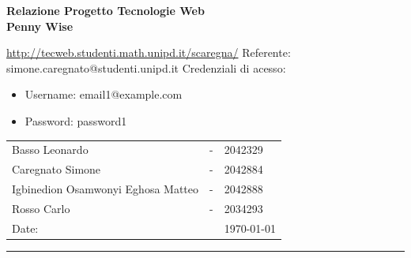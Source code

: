 \begin{titlepage}
\noindent{}
\vspace{15pt}
\textcolor{UM_Brown}{
\begin{flushleft}
    \textbf{\huge{Relazione Progetto Tecnologie Web}}\\
    \vspace{15pt}
    \huge \textbf{Penny Wise} \\
    \vspace{15pt}
	\begin{large}
    \url{http://tecweb.studenti.math.unipd.it/scaregna/}
	\newline
    Referente: simone.caregnato@studenti.unipd.it
	\newline
	Credenziali di acesso:
		\begin{itemize}
			\item[] Username: email1@example.com
			\item[] Password: password1
		\end{itemize}
	\end{large}
\end{flushleft}
}
\vspace{55pt}
\textcolor{UM_Brown}{
\begin{flushright}
\begin{tabular}{lcl}
    Basso Leonardo & - & 2042329 \\
    Caregnato Simone & - & 2042884 \\
    Igbinedion Osamwonyi Eghosa Matteo & - & 2042888 \\
    Rosso Carlo & - & 2034293 \\
    Date: &  & \today
\end{tabular}
\end{flushright}
\hrule
}
\end{titlepage}
